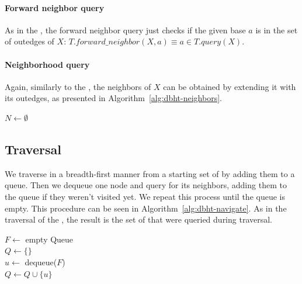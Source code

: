 \paragraph*{Forward neighbor query} As in the \dBCM, the forward neighbor query just checks if the given base $a$ is in the set of outedges of $X$: $T.\mathit{forward\_neighbor}(X, a) \equiv a \in T.\mathit{query}(X)$.

\paragraph*{Neighborhood query} Again, similarly to the \dBCM, the neighbors of $X$ can be obtained by extending it with its outedges, as presented in Algorithm~\ref{alg:dbht-neighbors}.

\begin{algorithm}
	\caption{$T.\mathit{neighbors}(X)$}\label{alg:dbht-neighbors}
  $N \gets \emptyset$\\
\end{algorithm}

\subsection{\dBHT Traversal}

We traverse \dBHT in a breadth-first manner from a starting set of   by adding them to a queue. Then we dequeue one node and query for its neighbors, adding them to the queue if they weren't visited yet. We repeat this process until the queue is empty. This procedure can be seen in Algorithm~\ref{alg:dbht-navigate}. As in the traversal of the \dBCM, the result is the set of  that were queried during traversal.

\begin{algorithm}
	\caption{$T.\mathit{traverse}(\strsetname{S}, t)$}\label{alg:dbht-navigate}
  $F \gets$ empty Queue\\
  $Q \gets \{\}$\\
   {
    $u \gets$ dequeue($F$)\\
    $Q \gets Q \cup \{u\}$\\
  }
\end{algorithm}


